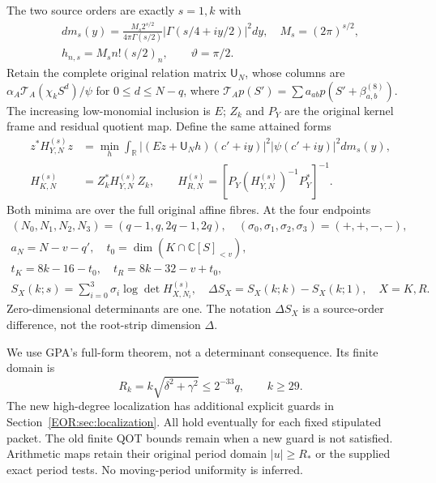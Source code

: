 \documentclass[11pt,a4paper]{article}
\providecommand{\C}{\mathbb C}
\providecommand{\R}{\mathbb R}
\begin{document}
The two source orders are exactly $s=1,k$ with
\begin{equation}
\begin{gathered}
 dm_s(y)=\frac{M_s2^{s/2}}{4\pi\Gamma(s/2)}
 |\Gamma(s/4+iy/2)|^2dy,\quad M_s=(2\pi)^{s/2},\\
 h_{n,s}=M_sn!(s/2)_n,\qquad \vartheta=\pi/2.
\end{gathered}\label{EOR:eq:sources}
\tag{EOR2}
\end{equation}
Retain the complete original relation matrix $\mathsf U_N$, whose columns are
$\alpha_A\mathcal T_A(\chi_kS^d)/\psi$ for $0\le d\le N-q$,
where $\mathcal T_Ap(S')=\sum a_{ab}p(S'+\beta_{a,b}^{(8)})$.
The increasing low-monomial inclusion is $E$; $Z_k$ and $P_Y$ are the original
kernel frame and residual quotient map. Define the same attained forms
\begin{equation}
\begin{split}
 z^*H_{Y,N}^{(s)}z&=\min_h\int_\R
 |(Ez+\mathsf U_Nh)(c'+iy)|^2|\psi(c'+iy)|^2dm_s(y),\\
 H_{K,N}^{(s)}&=Z_k^*H_{Y,N}^{(s)}Z_k,\qquad
 H_{R,N}^{(s)}=[P_Y(H_{Y,N}^{(s)})^{-1}P_Y^*]^{-1}.
\end{split}\label{EOR:eq:forms}
\tag{EOR3}
\end{equation}
Both minima are over the full original affine fibres. At the four endpoints
\begin{equation}
\begin{gathered}
 (N_0,N_1,N_2,N_3)=(q-1,q,2q-1,2q),\quad
 (\sigma_0,\sigma_1,\sigma_2,\sigma_3)=(+,+,-,-),\\
 a_N=N-v-q',\quad t_0=\dim(K\cap\C[S]_{<v}),\\
 t_K=8k-16-t_0,\quad t_R=8k-32-v+t_0,\\
 S_X(k;s)=\sum_{i=0}^3\sigma_i\log\det H_{X,N_i}^{(s)},
 \quad\Delta S_X=S_X(k;k)-S_X(k;1),\quad X=K,R.
\end{gathered}\label{EOR:eq:returns}
\tag{EOR4}
\end{equation}
Zero-dimensional determinants are one. The notation $\Delta S_X$ is a source-order
difference, not the root-strip dimension $\Delta$.

We use GPA's full-form theorem, not a determinant consequence. Its finite domain is
\begin{equation}
 R_k=k\sqrt{\delta^2+\gamma^2}\le2^{-33}q,\qquad k\ge29.
 \label{EOR:eq:GPA-domain}
\tag{EOR5}
\end{equation}
The new high-degree localization has additional explicit guards in
Section~\ref{EOR:sec:localization}. All hold eventually for each fixed stipulated
packet. The old finite QOT bounds remain when a new guard is not satisfied.
Arithmetic maps retain their original period domain $|u|\ge R_*$ or the supplied
exact period tests. No moving-period uniformity is inferred.
\end{document}
